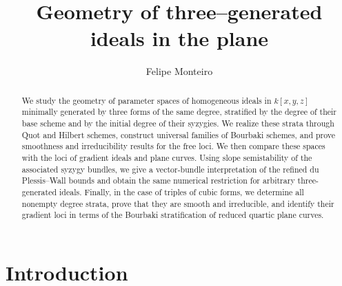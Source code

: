 \documentclass[11pt]{amsart} %
\theoremstyle{definition}
\begin{document}
		
		\title[Geometry of three--generated ideals in the plane]{Geometry of three--generated ideals in the plane} 
		\author{Felipe Monteiro}

        \address{
        IMECC, University of Campinas (UNICAMP),
        Campinas, SP, CEP 13083-872, Brazil
        }
        
        \address{
        Universit\'e Bourgogne Europe,
        CNRS, IMB UMR 5584,
        F-21000 Dijon, France
        }
		
  	


        
		\begin{abstract}
		We study the geometry of parameter spaces of homogeneous ideals in $k[x,y,z]$ minimally generated by three forms of the same degree, stratified by the degree of their base scheme and by the initial degree of their syzygies. We realize these strata through Quot and Hilbert schemes, construct universal families of Bourbaki schemes, and prove smoothness and irreducibility results for the free loci. We then compare these spaces with the loci of gradient ideals and plane curves. Using slope semistability of the associated syzygy bundles, we give a vector-bundle interpretation of the refined du Plessis--Wall bounds and obtain the same numerical restriction for arbitrary three-generated ideals. Finally, in the case of triples of cubic forms, we determine all nonempty degree strata, prove that they are smooth and irreducible, and identify their gradient loci in terms of the Bourbaki stratification of reduced quartic plane curves.
		\end{abstract}
	\maketitle
    		
    	\begingroup
            \tableofcontents
        \endgroup
		
\section*{Introduction}
\end{document}
